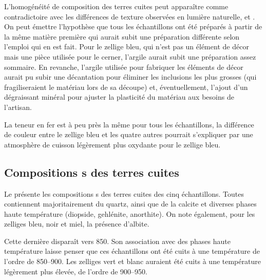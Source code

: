 L'homogénéité de composition des terres cuites peut apparaître comme 
contradictoire avec les différences de texture observées en lumière 
naturelle, \CL et \MEB[ie]. On peut émettre l'hypothèse que tous les 
échantillons ont été préparés à partir de la même matière première 
qui aurait subit une préparation différente selon l'emploi qui en est 
fait. Pour le zellige bleu, qui n'est pas un élément de décor mais une 
pièce utilisée pour le cerner, l'argile aurait subit une préparation 
assez sommaire. En revanche, l'argile utilisée pour fabriquer les 
éléments de décor aurait pu subir une décantation pour éliminer les 
inclusions les plus grosses (qui fragiliseraient le matériau lors de 
sa découpe) et, éventuellement, l'ajout d'un dégraissant minéral pour 
ajuster la plasticité du matériau aux besoins de l'artisan.

La teneur en fer est à peu près la même pour tous les échantillons, 
la différence de couleur entre le zellige bleu et les quatre autres 
pourrait s'expliquer par une atmosphère de cuisson légèrement plus 
oxydante pour le zellige bleu.

\subsection{Compositions \cristallo s des terres cuites}
Le  présente les compositions \cristallo s des terres cuites des cinq échantillons. Toutes contiennent majoritairement du quartz, ainsi que de la calcite et diverses phases haute température (diopside, gehlénite, anorthite). On note également, pour les zelliges bleu, noir et miel, la présence d'albite.

Cette dernière disparaît vers \SI{850}{\degC}. Son association avec des phases haute température laisse penser que ces échantillons ont été cuits à une température de l'ordre de \SIrange[range-phrase=\ à\ ]{850}{900}{\degC}. Les zelliges vert et blanc auraient été cuits à une température légèrement plus élevée, de l'ordre de \SIrange[range-phrase=\ à\ ]{900}{950}{\degC}.


